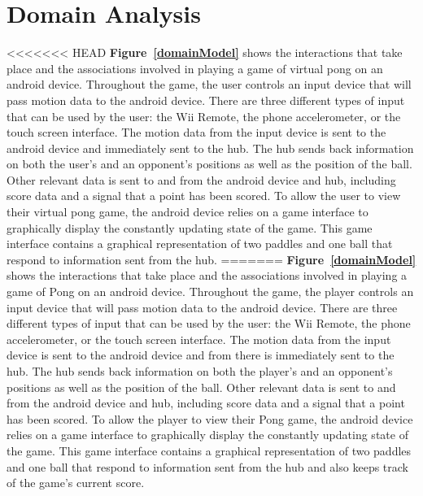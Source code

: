 \documentclass[12pt]{article}
\begin{document}
\section{Domain Analysis}
<<<<<<< HEAD
\textbf{Figure~\ref{domainModel}} shows the interactions that take place and the associations involved in playing a game of virtual pong on an android device.  Throughout the game, the user controls an input device that will pass motion data to the android device.  There are three different types of input that can be used by the user: the Wii Remote, the phone accelerometer, or the touch screen interface.  The motion data from the input device is sent to the android device and immediately sent to the hub.  The hub sends back information on both the user's and an opponent's positions as well as the position of the ball.  Other relevant data is sent to and from the android device and hub, including score data and a signal that a point has been scored.  To allow the user to view their virtual pong game, the android device relies on a game interface to graphically display the constantly updating state of the game.  This game interface contains a graphical representation of two paddles and one ball that respond to information sent from the hub.
=======
\textbf{Figure~\ref{domainModel}} shows the interactions that take place and the associations involved in playing a game of Pong on an android device.  Throughout the game, the player controls an input device that will pass motion data to the android device.  There are three different types of input that can be used by the user: the Wii Remote, the phone accelerometer, or the touch screen interface.  The motion data from the input device is sent to the android device and from there is immediately sent to the hub.  The hub sends back information on both the player's and an opponent's positions as well as the position of the ball.  Other relevant data is sent to and from the android device and hub, including score data and a signal that a point has been scored.  To allow the player to view their Pong game, the android device relies on a game interface to graphically display the constantly updating state of the game.  This game interface contains a graphical representation of two paddles and one ball that respond to information sent from the hub and also keeps track of the game's current score.
\end{document}
